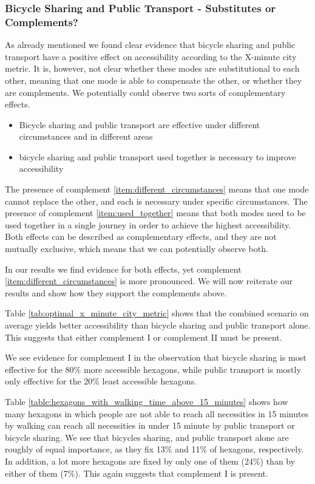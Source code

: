 \subsubsection{Bicycle Sharing and Public Transport - Substitutes or Complements?}
As already mentioned we found clear evidence that bicycle sharing and public transport have a positive effect on accessibility according to the X-minute city metric.
It is, however, not clear whether these modes are substitutional to each other, meaning that one mode is able to compensate the other, or whether they are complements.
We potentially could observe two sorts of complementary effects.
\begin{itemize}
  \renewcommand{\labelenumi}{Complement \theenumi.}
  \item Bicycle sharing and public transport are effective under different circumstances and in different areas \label{item:different_circumstances}
  \item bicycle sharing and public transport used together is necessary to improve accessibility \label{item:used_together}
\end{itemize}
The presence of complement \ref{item:different_circumstances} means that one mode cannot replace the other, and each is necessary under specific circumstances.
The presence of complement \ref{item:used_together} means that both modes need to be used together in a single journey in order to achieve the highest accessibility.
Both effects can be described as complementary effects, and they are not mutually exclusive, which means that we can potentially observe both.

In our results we find evidence for both effects, yet complement \ref{item:different_circumstances} is more pronounced.
We will now reiterate our results and show how they support the complements above.

Table \ref{tab:optimal_x_minute_city_metric} shows that the combined scenario on average yields better accessibility than bicycle sharing and public transport alone.
This suggests that either complement I or complement II must be present.

We see evidence for complement I in the observation that bicycle sharing is most effective for the 80\% more accessible hexagons, while public transport is mostly only effective for the 20\% least accessible hexagons.

Table \ref{table:hexagons_with_walking_time_above_15_minutes} shows how many hexagons in which people are not able to reach all necessities in 15 minutes by walking can reach all necessities in under 15 minute by public transport or bicycle sharing.
We see that bicycles sharing, and public transport alone are roughly of equal importance, as they fix 13\% and 11\% of hexagons, respectively.
In addition, a lot more hexagons are fixed by only one of them (24\%) than by either of them (7\%).
This again suggests that complement I is present.


